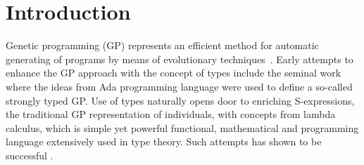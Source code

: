 \documentclass{sig-alternate}
\begin{document}


\section{Introduction}


Genetic programming (GP) represents an efficient method for automatic generating of programs by means of evolutionary techniques~\cite{koza92,koza03}. Early attempts to enhance the GP approach with the concept of types include the seminal work~\cite{montana95} where the ideas from Ada programming language were used to define a so-called strongly typed GP.   
Use of types naturally opens door to enriching S-expressions,
the traditional GP representation of individuals, with concepts from
lambda calculus, which is simple yet powerful functional, mathematical and programming language extensively used in type theory. Such attempts has shown to be successful \cite{yu01}. 
\end{document}
